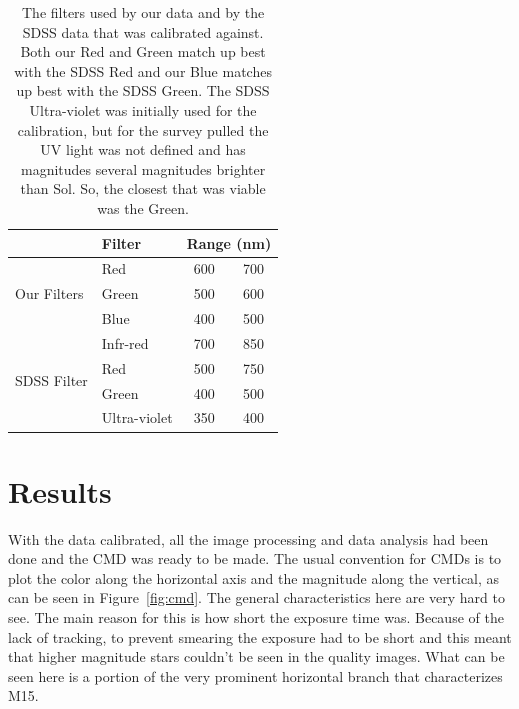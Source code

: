 \documentclass[twoside,11pt]{article}
\begin{document}
\begin{table}[ht]
\centering
\begin{tabular}{llcc}
                             & Filter       & \multicolumn{2}{c}{Range (nm)} \vspace{1ex}\\ \hline
\multirow{3}{*}{Our Filters} & Red          & 600            & 700           \\
                             & Green        & 500            & 600           \\
                             & Blue         & 400            & 500           \\ \hline
\multirow{4}{*}{SDSS Filter} & Infr-red     & 700            & 850           \\
                             & Red          & 500            & 750           \\
                             & Green        & 400            & 500           \\
                             & Ultra-violet & 350            & 400           \\ \hline
\end{tabular}
\caption{The filters used by our data and by the SDSS data that was calibrated against. Both our Red and Green match up best with the SDSS Red and our Blue matches up best with the SDSS Green. The SDSS Ultra-violet was initially used for the calibration, but for the survey pulled the UV light was not defined and has magnitudes several magnitudes brighter than Sol. So, the closest that was viable was the Green. \citep{filter}}
\label{tab:wavelengths}
\end{table}


\section{Results}

With the data calibrated, all the image processing and data analysis had been done and the CMD was ready to be made. The usual convention for CMDs is to plot the color along the horizontal axis and the magnitude along the vertical, as can be seen in Figure~\ref{fig:cmd}. The general characteristics here are very hard to see. The main reason for this is how short the exposure time was. Because of the lack of tracking, to prevent smearing the exposure had to be short and this meant that higher magnitude stars couldn't be seen in the quality images. What can be seen here is a portion of the very prominent horizontal branch that characterizes M15. 
\end{document}
